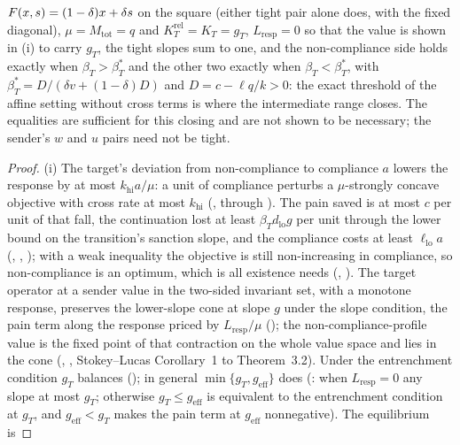 \begin{proposition}
\begin{enumerate}[label=(\roman*)]
$F(x,s)=(1-\delta)x+\delta s$ on the square (either tight pair alone does, with
the fixed diagonal), $\mu=M_{\mathrm{tot}}=q$ and
$K_T^{\mathrm{rel}}=K_T=g_T$, $L_{\mathrm{resp}}=0$ so that the value is shown in (i) to carry $g_T$,
the tight slopes sum to one, and the non-compliance side
holds exactly when $\beta_T>\beta_T^*$ and the other two exactly when
$\beta_T<\beta_T^*$, with $\beta_T^*=D/(\delta v+(1-\delta)D)$ and $D=c-\ell q/k>0$:
the exact threshold of the affine setting without cross terms is where the
intermediate range closes.
The equalities are sufficient for this closing and are not shown to be
necessary; the sender's $w$ and $u$ pairs need not be tight.
\end{enumerate}
\end{proposition}

\begin{proof}
(i) The target's deviation from non-compliance to compliance $a$ lowers the response
by at most $k_{\mathrm{hi}}a/\mu$: a unit of compliance perturbs a
$\mu$-strongly concave objective with cross rate at most $k_{\mathrm{hi}}$
(, through
). The
pain saved is at most $c$ per unit of that fall, the continuation lost at
least $\beta_Td_{\mathrm{lo}}g$ per unit through the lower bound on the transition's sanction slope, and
the compliance costs at least $\ell_{\mathrm{lo}}a$ (,
, ); with a weak
inequality the objective is still non-increasing in compliance, so non-compliance is
an optimum, which is all existence needs
(, ). The
target operator at a sender value in the two-sided invariant set, with a monotone
response, preserves the lower-slope cone at slope $g$ under the slope condition, the
pain term along the response priced by $L_{\mathrm{resp}}/\mu$
(); the non-compliance-profile value is the fixed
point of that contraction on the whole value space and lies in the cone
(, , Stokey--Lucas Corollary~1 to
Theorem~3.2). Under the entrenchment condition $g_T$ balances (); in general
$\min\{g_T,g_{\mathrm{eff}}\}$ does (: when $L_{\mathrm{resp}}=0$
any slope at most $g_T$; otherwise $g_T\le g_{\mathrm{eff}}$ is equivalent to
the entrenchment condition at $g_T$, and $g_{\mathrm{eff}}<g_T$ makes the pain term at
$g_{\mathrm{eff}}$ nonnegative). The equilibrium is

\end{proof}
